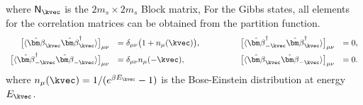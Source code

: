 where $\mathsf{N}_{\kvec}$ is the $2m_{s} \times 2m_{s}$ Block matrix, 
For the Gibbs states, all elements for the correlation matrices can be obtained from the partition function. 
\begin{equation}
    \begin{array}{rlrl}
        \big[ \langle \hat{\bm \beta}_{ \kvec}^{\phantom \dagger} \hat{\bm \beta}_{ \kvec}^{\dagger} \rangle \big]_{\mu\nu} 
        & = \delta_{\mu\nu} \big( 1 + n_{\mu}(\kvec) \big) , 
        \qquad & \qquad 
        \big[ \langle \hat{\bm\beta}_{-\kvec}^{\dagger} \hat{\bm\beta}_{\kvec}^{\dagger} \rangle \big]_{\mu\nu} & = 0  ,
        \\[0.5em]
        \big[ \langle \hat{\bm\beta}_{-\kvec}^{\dagger} \hat{\bm\beta}_{- \kvec}^{\phantom \dagger} \rangle \big]_{\mu\nu}
        & = \delta_{\mu\nu} n_{\mu}(-\kvec) ,
        \qquad & \qquad 
        \big[ \langle \hat{\bm\beta}_{\kvec} \hat{\bm\beta}_{-\kvec} \rangle \big]_{\mu\nu} & = 0.
    \end{array}
\end{equation}
where $n_{\mu}(\kvec) = 1/(e^{\beta E_{\kvec}} - 1)$ is the Bose-Einstein distribution at energy $E_{\kvec}$. 








\newpage
